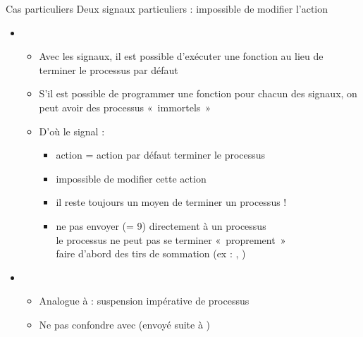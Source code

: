 \begin {frame} {Cas particuliers}
    Deux signaux particuliers : impossible de modifier l'action

    \begin {itemize}
	\item {}
	    \begin {itemize}
		\item Avec les signaux, il est possible d'exécuter une fonction
		    au lieu de terminer le processus par défaut

		\item S'il est possible de programmer une fonction pour chacun
		    des signaux, on peut avoir des processus «~immortels~»

		\item D'où le signal  :
		    \begin {itemize}
			\item action = action par défaut
			    \implique terminer le processus
			\item impossible de modifier cette action
			\item il reste toujours un moyen de terminer un processus !
			\item ne pas envoyer  (= 9)
			    directement à un processus \\
			    \implique le processus ne peut pas se terminer
				«~proprement~» \\
			    \implique faire d'abord des tirs de sommation
				(ex : , )

		    \end {itemize}

	    \end {itemize}

	\item {}
	    \begin {itemize}
		\item Analogue à  : 
		    suspension impérative de processus
		\item Ne pas confondre avec 
		    (envoyé suite à )

	    \end {itemize}

    \end {itemize}
\end {frame}



